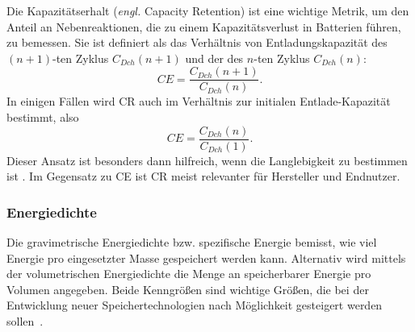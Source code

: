 Die Kapazitätserhalt (\textit{engl.} Capacity Retention) ist eine wichtige Metrik, um den Anteil an Nebenreaktionen, die zu einem Kapazitätsverlust in Batterien führen, zu bemessen. Sie ist definiert als das Verhältnis von Entladungskapazität des $(n+1)$-ten Zyklus $C_{Dch}(n+1)$ und der des $n$-ten Zyklus $C_{Dch}(n)$:
\begin{equation}
    CE = \frac{C_{Dch}(n+1)}{C_{Dch}(n)}.
\end{equation}
In einigen Fällen wird CR auch im Verhältnis zur initialen Entlade-Kapazität bestimmt, also
\begin{equation}
    CE = \frac{C_{Dch}(n)}{C_{Dch}(1)}.
\end{equation}
Dieser Ansatz ist besonders dann hilfreich, wenn die Langlebigkeit zu bestimmen ist \cite{Tornheim2020}.
Im Gegensatz zu CE ist CR meist relevanter für Hersteller und Endnutzer.

\subsubsection*{Energiedichte}
Die gravimetrische Energiedichte bzw. spezifische Energie bemisst, wie viel Energie pro eingesetzter Masse gespeichert werden kann. Alternativ wird mittels der volumetrischen Energiedichte die Menge an speicherbarer Energie pro Volumen angegeben. Beide Kenngrößen sind wichtige Größen, die bei der Entwicklung neuer Speichertechnologien nach Möglichkeit gesteigert werden sollen~\cite{Plett2015}.

